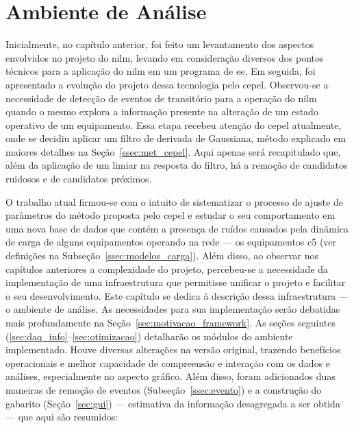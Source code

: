 \chapter{Ambiente de Análise}%
\label{chap:framework}

Inicialmente, no capítulo anterior, foi feito um levantamento dos
aspectos envolvidos no projeto do \acs{nilm}, levando em consideração
diversos dos pontos técnicos para a aplicação do \acs{nilm} em um programa
de \acs{ee}. Em seguida, foi apresentado a evolução do projeto dessa
tecnologia pelo \acs{cepel}.  Observou-se a necessidade de detecção de
eventos de transitório para a operação do \acs{nilm} quando o mesmo
explora a informação presente na alteração de um estado operativo de
um equipamento. Essa etapa recebeu atenção do \acs{cepel} atualmente,
onde se decidiu aplicar um filtro de derivada de Gaussiana,
método explicado em maiores detalhes na
Seção~\ref{ssec:met_cepel}. Aqui apenas será recapitulado que, além da
aplicação de um limiar na resposta do filtro, há a remoção de
candidatos ruidosos e de candidatos próximos.

O trabalho atual firmou-se com o intuito de sistematizar o processo de
ajuste de parâmetros do método proposta pelo \acs{cepel} e
estudar o seu comportamento em uma nova base de dados que
contém a presença de ruídos causados pela dinâmica de carga
de alguns equipamentos operando na rede --- os equipamentos
\acs{c5} (ver definições na Subseção~\ref{ssec:modelos_carga}).
Além disso, ao observar nos capítulos anteriores a complexidade do
projeto, percebeu-se a necessidade da implementação de uma
infraestrutura que permitisse unificar o projeto e facilitar o seu
desenvolvimento. Este capítulo se dedica à descrição dessa
infraestrutura --- o ambiente de análise. As necessidades para sua
implementação serão debatidas mais profundamente na
Seção~\ref{sec:motivacao_framework}. As seções seguintes
(\ref{sec:daq_info}--\ref{sec:otimizacao}) detalharão os módulos do
ambiente implementado. Houve diversas alterações na versão original,
trazendo benefícios operacionais e melhor capacidade de compreensão e
interação com os dados e análises, especialmente no aspecto gráfico.
Além disso, foram adicionados duas maneiras de remoção de eventos
(Subseção~\ref{ssec:evento}) e a construção do gabarito
(Seção~\ref{sec:gui}) --- estimativa da informação desagregada a ser
obtida --- que aqui são resumidos:

